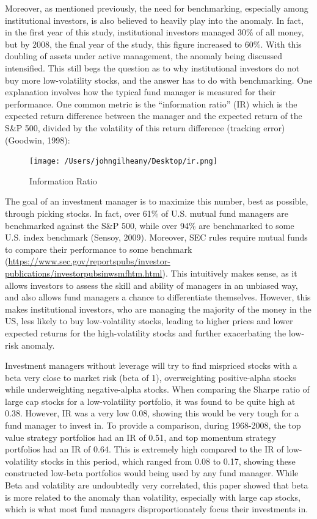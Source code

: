 \documentclass[12pt,twoside]{reedthesis}
\theoremstyle{definition}
\theoremstyle{definition}
\theoremstyle{definition}
\theoremstyle{remark}
\begin{document}
Moreover, as mentioned previously, the need for benchmarking, especially
among institutional investors, is also believed to heavily play into the
anomaly. In fact, in the first year of this study, institutional
investors managed 30\% of all money, but by 2008, the final year of the
study, this figure increased to 60\%. With this doubling of assets under
active management, the anomaly being discussed intensified. This still
begs the question as to why institutional investors do not buy more
low-volatility stocks, and the answer has to do with benchmarking. One
explanation involves how the typical fund manager is measured for their
performance. One common metric is the ``information ratio'' (IR) which
is the expected return difference between the manager and the expected
return of the S\&P 500, divided by the volatility of this return
difference (tracking error) (Goodwin, 1998):
\begin{figure}
\centerline{\texttt{[image: /Users/johngilheany/Desktop/ir.png]}}
\caption{Information Ratio}
\label{IR}
\end{figure}
The goal of an investment manager is to maximize this number, best as
possible, through picking stocks. In fact, over 61\% of U.S. mutual fund
managers are benchmarked against the S\&P 500, while over 94\% are
benchmarked to some U.S. index benchmark (Sensoy, 2009). Moreover, SEC
rules require mutual funds to compare their performance to some
benchmark
(\url{https://www.sec.gov/reportspubs/investor-publications/investorpubsinwsmfhtm.html}).
This intuitively makes sense, as it allows investors to assess the skill
and ability of managers in an unbiased way, and also allows fund
managers a chance to differentiate themselves. However, this makes
institutional investors, who are managing the majority of the money in
the US, less likely to buy low-volatility stocks, leading to higher
prices and lower expected returns for the high-volatility stocks and
further exacerbating the low-risk anomaly.

Investment managers without leverage will try to find mispriced stocks
with a beta very close to market risk (beta of 1), overweighting
positive-alpha stocks while underweighting negative-alpha stocks. When
comparing the Sharpe ratio of large cap stocks for a low-volatility
portfolio, it was found to be quite high at 0.38. However, IR was a very
low 0.08, showing this would be very tough for a fund manager to invest
in. To provide a comparison, during 1968-2008, the top value strategy
portfolios had an IR of 0.51, and top momentum strategy portfolios had
an IR of 0.64. This is extremely high compared to the IR of
low-volatility stocks in this period, which ranged from 0.08 to 0.17,
showing these constructed low-beta portfolios would being used by any
fund manager. While Beta and volatility are undoubtedly very correlated,
this paper showed that beta is more related to the anomaly than
volatility, especially with large cap stocks, which is what most fund
managers disproportionately focus their investments in.
\end{document}
